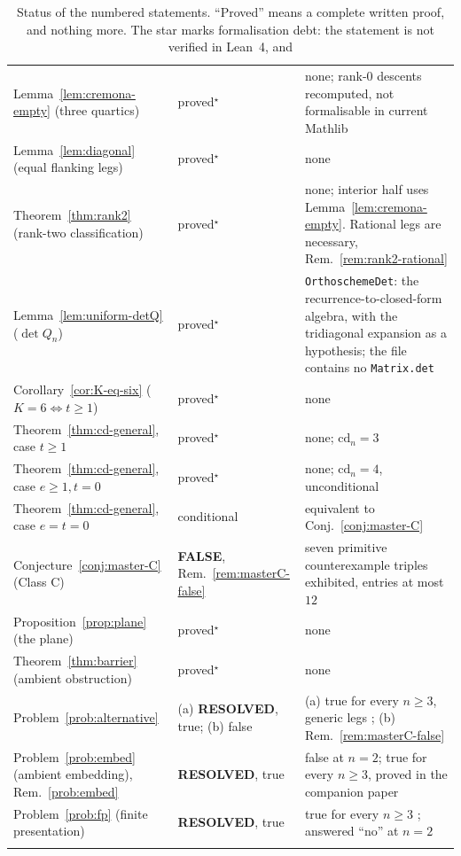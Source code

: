 \documentclass[11pt,a4paper]{article}
\newcommand{\cd}{\mathrm{cd}}
\theoremstyle{definition}
\theoremstyle{remark}
\theoremstyle{plain}
\begin{document}
\begin{longtable}{@{}p{} p{} p{}@{}}
Lemma~\ref{lem:cremona-empty} (three quartics)   & proved$^\star$ & none; rank-$0$ descents recomputed, not formalisable in current Mathlib \\
Lemma~\ref{lem:diagonal} (equal flanking legs)   & proved$^\star$ & none \\
Theorem~\ref{thm:rank2} (rank-two classification)& proved$^\star$ & none; interior half uses Lemma~\ref{lem:cremona-empty}. Rational legs are necessary, Rem.~\ref{rem:rank2-rational} \\
Lemma~\ref{lem:uniform-detQ} ($\det Q_n$)        & proved$^\star$ & \texttt{OrthoschemeDet}: the recurrence-to-closed-form algebra, with the tridiagonal expansion as a hypothesis; the file contains no \texttt{Matrix.det} \\
Corollary~\ref{cor:K-eq-six} ($K=6\iff t\ge1$)   & proved$^\star$ & none \\
Theorem~\ref{thm:cd-general}, case $t\ge1$       & proved$^\star$ & none; $\cd_n=3$ \\
Theorem~\ref{thm:cd-general}, case $e\ge1,t=0$   & proved$^\star$ & none; $\cd_n=4$, unconditional \\
Theorem~\ref{thm:cd-general}, case $e=t=0$       & conditional    & equivalent to Conj.~\ref{conj:master-C} \\
Conjecture~\ref{conj:master-C} (Class C)         & \textbf{FALSE}, Rem.~\ref{rem:masterC-false} & seven primitive counterexample triples exhibited, entries at most $12$ \\
Proposition~\ref{prop:plane} (the plane)         & proved$^\star$ & none \\
Theorem~\ref{thm:barrier} (ambient obstruction)  & proved$^\star$ & none \\
Problem~\ref{prob:alternative}                   & (a) \textbf{RESOLVED}, true; (b) false & (a) true for every $n\ge3$, generic legs \cite{Bonfioli3}; (b) Rem.~\ref{rem:masterC-false} \\
Problem~\ref{prob:embed} (ambient embedding), Rem.~\ref{prob:embed} & \textbf{RESOLVED}, true & false at $n=2$; true for every $n\ge3$, proved in the companion paper \\
Problem~\ref{prob:fp} (finite presentation)      & \textbf{RESOLVED}, true & true for every $n\ge3$ \cite{Bonfioli3}; answered ``no'' at $n=2$ \cite{isola-piergallini} \\
\bottomrule
\caption{Status of the numbered statements. ``Proved'' means a complete written proof, and
nothing more. The star marks formalisation debt: the statement is not verified in Lean~4, and
}
\end{longtable}
\end{document}
